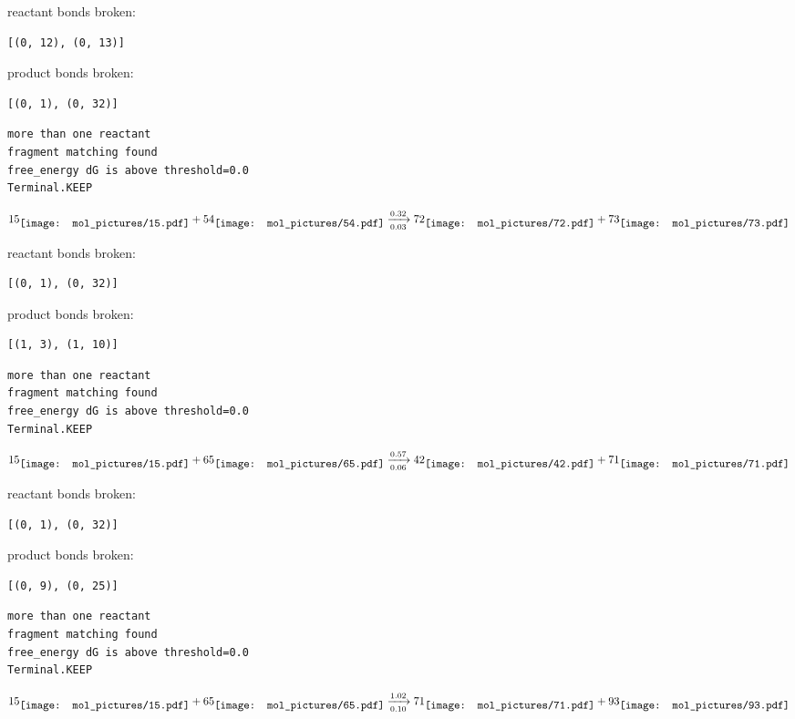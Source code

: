 \documentclass{article}
\begin{document}
reactant bonds broken:\begin{verbatim}
[(0, 12), (0, 13)]
\end{verbatim}
product bonds broken:\begin{verbatim}
[(0, 1), (0, 32)]
\end{verbatim}




\vspace{1cm}
\begin{verbatim}
more than one reactant
fragment matching found
free_energy dG is above threshold=0.0
Terminal.KEEP
\end{verbatim}
$$
15
\raisebox{-.5\height}{\texttt{[image: mol\_pictures/15.pdf]}}
+
54
\raisebox{-.5\height}{\texttt{[image: mol\_pictures/54.pdf]}}
\xrightarrow[0.03]{0.32}
72
\raisebox{-.5\height}{\texttt{[image: mol\_pictures/72.pdf]}}
+
73
\raisebox{-.5\height}{\texttt{[image: mol\_pictures/73.pdf]}}
$$


reactant bonds broken:\begin{verbatim}
[(0, 1), (0, 32)]
\end{verbatim}
product bonds broken:\begin{verbatim}
[(1, 3), (1, 10)]
\end{verbatim}




\vspace{1cm}
\begin{verbatim}
more than one reactant
fragment matching found
free_energy dG is above threshold=0.0
Terminal.KEEP
\end{verbatim}
$$
15
\raisebox{-.5\height}{\texttt{[image: mol\_pictures/15.pdf]}}
+
65
\raisebox{-.5\height}{\texttt{[image: mol\_pictures/65.pdf]}}
\xrightarrow[0.06]{0.57}
42
\raisebox{-.5\height}{\texttt{[image: mol\_pictures/42.pdf]}}
+
71
\raisebox{-.5\height}{\texttt{[image: mol\_pictures/71.pdf]}}
$$


reactant bonds broken:\begin{verbatim}
[(0, 1), (0, 32)]
\end{verbatim}
product bonds broken:\begin{verbatim}
[(0, 9), (0, 25)]
\end{verbatim}




\vspace{1cm}
\begin{verbatim}
more than one reactant
fragment matching found
free_energy dG is above threshold=0.0
Terminal.KEEP
\end{verbatim}
$$
15
\raisebox{-.5\height}{\texttt{[image: mol\_pictures/15.pdf]}}
+
65
\raisebox{-.5\height}{\texttt{[image: mol\_pictures/65.pdf]}}
\xrightarrow[0.10]{1.02}
71
\raisebox{-.5\height}{\texttt{[image: mol\_pictures/71.pdf]}}
+
93
\raisebox{-.5\height}{\texttt{[image: mol\_pictures/93.pdf]}}
$$
\end{document}
